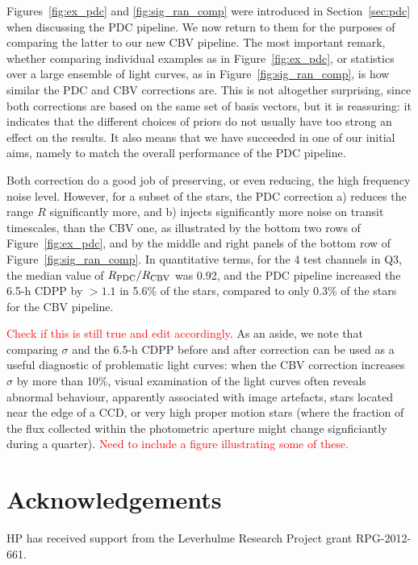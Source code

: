 \documentclass[useAMS,usenatbib]{mn2e}
\begin{document}
Figures~\ref{fig:ex_pdc} and \ref{fig:sig_ran_comp} were introduced in Section~\ref{sec:pdc} when discussing the PDC pipeline. We now return to them for the purposes of comparing the latter to our new CBV pipeline. The most important remark, whether comparing individual examples as in Figure~\ref{fig:ex_pdc}, or statistics over a large ensemble of light curves, as in Figure~\ref{fig:sig_ran_comp}, is how similar the PDC and CBV corrections are. This is not altogether surprising,
since both corrections are based on the same set of basis vectors, but
it is reassuring: it indicates that the different choices of priors do
not usually have too strong an effect on the results. It also means that we have succeeded in one of our initial aims, namely to match the overall performance of the PDC pipeline. 

Both correction do a good job of preserving, or even reducing, the high frequency noise level. However, for
a subset of the stars, the PDC correction a) reduces the range $R$ significantly more, and b) injects significantly more
noise on transit timescales, than the CBV one, as illustrated by the bottom two rows of Figure~\ref{fig:ex_pdc}, and by the middle and right panels of the bottom row of Figure~\ref{fig:sig_ran_comp}. In
quantitative terms, for the 4 test channels in Q3, the median value of $R_{\rm PDC}/R_{\rm CBV}$ was 0.92, and the PDC pipeline increased the 6.5-h CDPP by $>1.1$ in 5.6\% of the stars, compared to only 0.3\% of the stars for the CBV pipeline.

\textcolor{red}{Check if this is still true and edit accordingly}. As an aside, we note that comparing $\sigma$ and the 6.5-h CDPP before and after
correction can be used as a useful diagnostic of problematic light
curves: when the CBV correction increases $\sigma$ by
more than 10\%, visual examination of the light curves often reveals
abnormal behaviour, apparently associated with image artefacts, stars
located near the edge of a CCD, or very high proper motion stars
(where the fraction of the flux collected within the photometric
aperture might change signficiantly during a quarter). \textcolor{red}{Need to
include a figure illustrating some of these.}




\section*{Acknowledgements}
HP has received support from the Leverhulme Research Project grant RPG-2012-661.

\label{lastpage}



\end{document}

